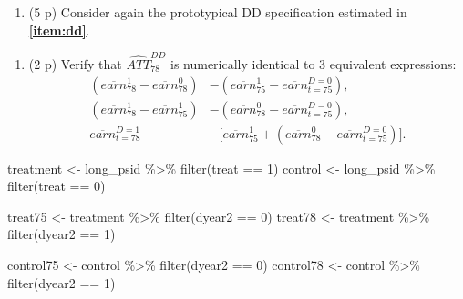 \documentclass[
]{article}
\newenvironment{Shaded}{\begin{snugshade}}{\end{snugshade}}
\newcommand{\DecValTok}[1]{\textcolor[rgb]{0.00,0.00,0.81}{#1}}
\newcommand{\FunctionTok}[1]{\textcolor[rgb]{0.00,0.00,0.00}{#1}}
\newcommand{\NormalTok}[1]{#1}
\newcommand{\OtherTok}[1]{\textcolor[rgb]{0.56,0.35,0.01}{#1}}
\newcommand{\SpecialCharTok}[1]{\textcolor[rgb]{0.00,0.00,0.00}{#1}}
\providecommand{\tightlist}{%
  \setlength{\itemsep}{0pt}\setlength{\parskip}{0pt}}
\begin{document}
\begin{enumerate}
\def\labelenumi{\arabic{enumi}.}
\setcounter{enumi}{6}
\tightlist
\item
  (5 p) Consider again the prototypical DD specification estimated in
  \textbf{\ref{item:dd}}.
\end{enumerate}

\begin{enumerate}
\def\labelenumi{\alph{enumi}.}
\tightlist
\item
  (2 p) Verify that \(\widehat{ATT}_{78}^{DD}\) is numerically identical
  to 3 equivalent expressions:\label{item:DinD-diff} \begin{align}
      \left( \overline{earn}_{78}^{1}-\overline{earn}_{78}^{0}\right) &-\left( \overline{earn}_{75}^{1}-\overline{earn}_{t=75}^{D=0}\right),\label{eq:DDv1} \\
      \left( \overline{earn}_{78}^{1} -\overline{earn}_{75}^{1}\right) &-\left( \overline{earn}_{78}^{0}-\overline{earn}_{t=75}^{D=0}\right),\label{eq:DDv2} \\ 
      \overline{earn}_{t=78}^{D=1} &- \big[ \overline{earn}_{75}^{1}+ \left( \overline{earn}_{78}^{0}-\overline{earn}_{t=75}^{D=0}\right) \big].\label{eq:DDv3}
      \end{align}
\end{enumerate}

\begin{Shaded}
\begin{Highlighting}[]
\NormalTok{treatment }\OtherTok{\textless{}{-}}\NormalTok{ long\_psid }\SpecialCharTok{\%\textgreater{}\%} \FunctionTok{filter}\NormalTok{(treat }\SpecialCharTok{==} \DecValTok{1}\NormalTok{)}
\NormalTok{control }\OtherTok{\textless{}{-}}\NormalTok{ long\_psid }\SpecialCharTok{\%\textgreater{}\%} \FunctionTok{filter}\NormalTok{(treat }\SpecialCharTok{==} \DecValTok{0}\NormalTok{)}

\NormalTok{treat75 }\OtherTok{\textless{}{-}}\NormalTok{ treatment }\SpecialCharTok{\%\textgreater{}\%} \FunctionTok{filter}\NormalTok{(dyear2 }\SpecialCharTok{==} \DecValTok{0}\NormalTok{)}
\NormalTok{treat78 }\OtherTok{\textless{}{-}}\NormalTok{ treatment }\SpecialCharTok{\%\textgreater{}\%} \FunctionTok{filter}\NormalTok{(dyear2 }\SpecialCharTok{==} \DecValTok{1}\NormalTok{)}

\NormalTok{control75 }\OtherTok{\textless{}{-}}\NormalTok{ control }\SpecialCharTok{\%\textgreater{}\%} \FunctionTok{filter}\NormalTok{(dyear2 }\SpecialCharTok{==} \DecValTok{0}\NormalTok{)}
\NormalTok{control78 }\OtherTok{\textless{}{-}}\NormalTok{ control }\SpecialCharTok{\%\textgreater{}\%} \FunctionTok{filter}\NormalTok{(dyear2 }\SpecialCharTok{==} \DecValTok{1}\NormalTok{)}
\end{Highlighting}
\end{Shaded}
\end{document}
